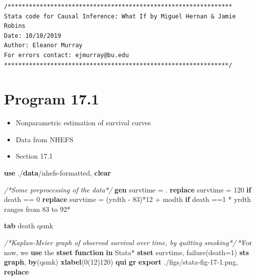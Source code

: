 \documentclass[
  10pt,
]{book}
\newenvironment{Shaded}{\begin{snugshade}}{\end{snugshade}}
\newcommand{\CommentTok}[1]{\textcolor[rgb]{0.56,0.35,0.01}{\textit{#1}}}
\newcommand{\KeywordTok}[1]{\textcolor[rgb]{0.13,0.29,0.53}{\textbf{#1}}}
\newcommand{\NormalTok}[1]{#1}
\providecommand{\tightlist}{%
  \setlength{\itemsep}{0pt}\setlength{\parskip}{0pt}}
\begin{document}
\begin{verbatim}
/***************************************************************
Stata code for Causal Inference: What If by Miguel Hernan & Jamie Robins
Date: 10/10/2019
Author: Eleanor Murray 
For errors contact: ejmurray@bu.edu
***************************************************************/
\end{verbatim}

\hypertarget{program-17.1}{%
\section{Program 17.1}\label{program-17.1}}

\begin{itemize}
\tightlist
\item
  Nonparametric estimation of survival curves
\item
  Data from NHEFS
\item
  Section 17.1
\end{itemize}

\begin{Shaded}
\begin{Highlighting}[]
\KeywordTok{use}\NormalTok{ ./}\KeywordTok{data}\NormalTok{/nhefs-formatted, }\KeywordTok{clear}

\CommentTok{/*Some preprocessing of the data*/}
\KeywordTok{gen}\NormalTok{ survtime = .}
\KeywordTok{replace}\NormalTok{ survtime = 120 }\KeywordTok{if}\NormalTok{ death == 0}
\KeywordTok{replace}\NormalTok{ survtime = (yrdth - 83)*12 + modth }\KeywordTok{if}\NormalTok{ death ==1}
\NormalTok{* yrdth ranges from 83 to 92*}

\KeywordTok{tab}\NormalTok{ death qsmk}

\CommentTok{/*Kaplan-Meier graph of observed survival over time, by quitting smoking*/}
\NormalTok{*For now, we }\KeywordTok{use}\NormalTok{ the }\KeywordTok{stset} \KeywordTok{function} \KeywordTok{in}\NormalTok{ Stata*}
\KeywordTok{stset}\NormalTok{ survtime, failure(death=1)}
\KeywordTok{sts} \KeywordTok{graph}\NormalTok{, }\KeywordTok{by}\NormalTok{(qsmk) }\KeywordTok{xlabel}\NormalTok{(0(12)120)}
\KeywordTok{qui} \KeywordTok{gr} \KeywordTok{export}\NormalTok{ ./figs/stata-fig-17-1.png, }\KeywordTok{replace}
\end{Highlighting}
\end{Shaded}
\end{document}
